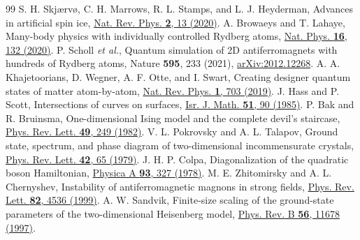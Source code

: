 \documentclass[aps,prb,twocolumn,superscriptaddress,floatfix]{revtex4-2}
\begin{document}
\begin{thebibliography}{99}
 S. H. Skj\ae rv\o, C. H. Marrows, R. L. Stamps, and L. J. Heyderman, Advances in artificial spin ice, \href{https://doi.org/10.1038/s42254-019-0118-3}{Nat. Rev. Phys. \textbf{2}, 13 (2020)}.
 A. Browaeys and T. Lahaye, Many-body physics with individually controlled Rydberg atoms, \href{https://doi.org/10.1038/s41567-019-0733-z}{Nat. Phys. \textbf{16}, 132 (2020)}.
 P. Scholl \textit{et al.}, Quantum simulation of 2D antiferromagnets with hundreds of Rydberg atoms, Nature \textbf{595}, 233 (2021), \href{https://arxiv.org/abs/2012.12268}{arXiv:2012.12268}.
 A. A. Khajetoorians, D. Wegner, A. F. Otte, and I. Swart, Creating designer quantum states of matter atom-by-atom, \href{https://doi.org/10.1038/s42254-019-0108-5}{Nat. Rev. Phys. \textbf{1}, 703 (2019)}.
 J. Hass and P. Scott, Intersections of curves on surfaces, \href{https://doi.org/10.1007/BF02772960}{Isr. J. Math. \textbf{51}, 90 (1985)}.
 P. Bak and R. Bruinsma, One-dimensional Ising model and the complete devil's staircase, \href{https://doi.org/10.1103/PhysRevLett.49.249}{Phys. Rev. Lett. \textbf{49}, 249 (1982)}.
 V. L. Pokrovsky and A. L. Talapov, Ground state, spectrum, and phase diagram of two-dimensional incommensurate crystals, \href{https://doi.org/10.1103/PhysRevLett.42.65}{Phys. Rev. Lett. \textbf{42}, 65 (1979)}.
 J. H. P. Colpa, Diagonalization of the quadratic boson Hamiltonian, \href{https://doi.org/10.1016/0378-4371(78)90160-7}{Physica A \textbf{93}, 327 (1978)}.
 M. E. Zhitomirsky and A. L. Chernyshev, Instability of antiferromagnetic magnons in strong fields, \href{https://doi.org/10.1103/PhysRevLett.82.4536}{Phys. Rev. Lett. \textbf{82}, 4536 (1999)}.
 A. W. Sandvik, Finite-size scaling of the ground-state parameters of the two-dimensional Heisenberg model, \href{https://doi.org/10.1103/PhysRevB.56.11678}{Phys. Rev. B \textbf{56}, 11678 (1997)}.
\end{thebibliography}
\end{document}
